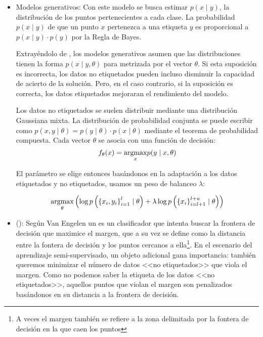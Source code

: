 \begin{itemize}
  \item Modelos generativos: Con este modelo se busca estimar $p(x \mid y)$, la distribución de los puntos pertenecientes a cada clase. La probabilidad $p(x \mid y)$ de que un punto $x$ pertenezca a una etiqueta $y$ es proporcional a $p(x \mid y) \cdot p(y)$ por la Regla de Bayes.

        Extrayéndolo de , los modelos generativos asumen que las distribuciones tienen la forma $p(x \mid y, \theta)$ para metrizada por el vector $\theta$. Si esta suposición es incorrecta, los datos no etiquetados pueden incluso disminuir la capacidad de acierto de la solución. Pero, en el caso contrario, si la suposición es correcta, los datos etiquetados mejoraran el rendimiento del modelo.

        Los datos no etiquetados se suelen distribuir mediante una distribución Gaussiana mixta. La distribución de probabilidad conjunta se puede escribir como $p(x,y \mid \theta) = p(y \mid \theta) \cdot p(x \mid \theta)$ mediante el teorema de probabilidad compuesta. Cada vector $\theta$ se asocia con una función de decisión: \[f_{\theta}(x) = \underset{x}{\operatorname{argmax}} p(y \mid x, \theta)\]

        El parámetro se elige entonces basándonos en la adaptación a los datos etiquetados y no etiquetados, usamos un peso de balanceo $\lambda$:

        \begin{equation*}
          \underset{\theta}{\operatorname{argmax}} \left( \log p\left(\left\{x_i, y_i\right\}_{i=1}^{l} \mid \theta\right)+\lambda \log p\left(\left\{x_i\right\}_{i=l+1}^{l+u} \mid \theta \right) \right)
        \end{equation*}

  \item {} (): Según Van Engelen \et {} un  es un clasificador que intenta buscar la frontera de decisión que maximice el margen, que a su vez se define como la distancia entre la fontera de decisión y los puntos cercanos a ella\footnote{A veces el margen también se refiere a la zona delimitada por la fontera de decisión en la que caen los puntos}. En el escenario del aprendizaje semi-supervisado, un objeto adicional gana importancia: también queremos minimizar el número de datos <<no etiquetados>> que viola el margen. Como no podemos saber la etiqueta de los datos <<no etiquetados>>, aquellos puntos que violan el margen son penalizados basándonos en su distancia a la frontera de decisión.


\end{itemize}
